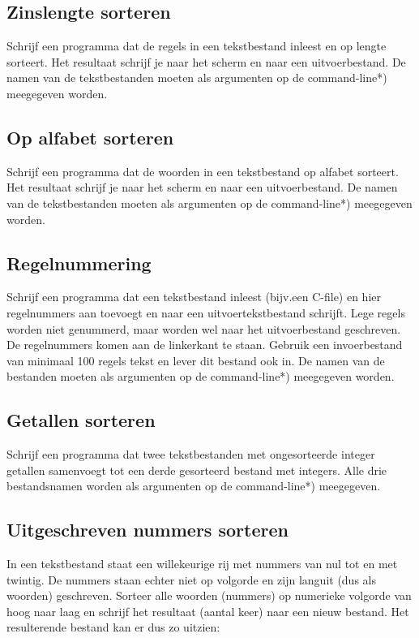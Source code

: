 \documentclass[a4paper,10pt,fleqn,twoside]{article}
\begin{document}
\subsection{Zinslengte sorteren}
Schrijf een programma dat de regels in een tekstbestand inleest en op lengte sorteert. Het resultaat schrijf je naar het scherm en naar een uitvoerbestand. De namen van de tekstbestanden moeten als argumenten op de command-line*) meegegeven worden.

\subsection{Op alfabet sorteren}
Schrijf een programma dat de woorden in een tekstbestand op alfabet sorteert. Het resultaat schrijf je naar het scherm en naar een uitvoerbestand. De namen van de tekstbestanden moeten als argumenten op de command-line*) meegegeven worden.

\subsection{Regelnummering}
Schrijf een programma dat een tekstbestand inleest (bijv.\@ een C-file) en hier regelnummers aan toevoegt en naar een uitvoertekstbestand schrijft. Lege regels worden niet genummerd, maar worden wel naar het uitvoerbestand geschreven. De regelnummers komen aan de linkerkant te staan. Gebruik een invoerbestand van minimaal 100 regels tekst en lever dit bestand ook in. De namen van de bestanden moeten als argumenten op de command-line*) meegegeven worden.

\subsection{Getallen sorteren }
Schrijf een programma dat twee tekstbestanden met ongesorteerde integer getallen samenvoegt tot een derde gesorteerd bestand met integers. Alle drie bestandsnamen worden als argumenten op de command-line*) meegegeven.

\subsection{Uitgeschreven nummers sorteren}
In een tekstbestand staat een willekeurige rij met nummers van nul tot en met twintig. De nummers staan echter niet op volgorde en zijn languit (dus als woorden) geschreven. Sorteer alle woorden (nummers) op numerieke volgorde van hoog naar laag en schrijf het resultaat (aantal keer) naar een nieuw bestand. Het resulterende bestand kan er dus zo uitzien:
\end{document}
